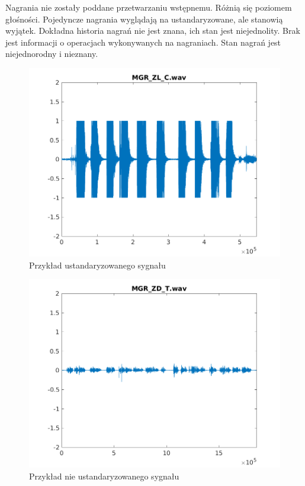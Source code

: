 \documentclass[a4paper,12pt,twoside,openany]{report}
\begin{document}
Nagrania nie zostały poddane przetwarzaniu wstępnemu. 
Różnią się poziomem głośności.
Pojedyncze nagrania wyglądają na ustandaryzowane, ale stanowią wyjątek.
Dokładna historia nagrań nie jest znana, ich stan jest niejednolity.
Brak jest informacji o operacjach wykonywanych na nagraniach.
Stan nagrań jest niejednorodny i nieznany.
\begin{figure}[h]
	\centering
	\includegraphics[width=\textwidth]{MGR_ZL_C-plot}
	\caption{Przykład ustandaryzowanego sygnału}
\end{figure}
\begin{figure}[h]
	\centering
	\includegraphics[width=\textwidth]{MGR_ZD_T-plot}
	\caption{Przykład nie ustandaryzowanego sygnału}
\end{figure}
\end{document}
